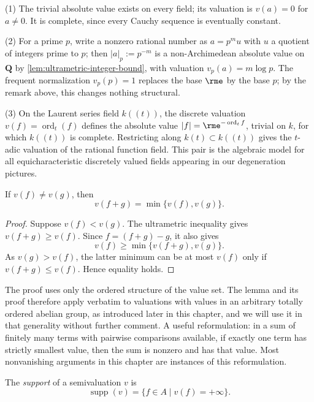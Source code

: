\begin{example}\label{ex:basic-absolute-values}
(1) The trivial absolute value exists on every field; its valuation is
$v(a)=0$ for $a\ne0$. It is complete, since every Cauchy sequence is
eventually constant.

(2) For a prime $p$, write a nonzero rational number as
$a=p^{m}u$ with $u$ a quotient of integers prime to $p$; then
$|a|_p:=p^{-m}$ is a non-Archimedean absolute value on $\mathbf Q$ by
\cref{lem:ultrametric-integer-bound}, with valuation
$v_p(a)=m\log p$. The frequent normalization $v_p(p)=1$ replaces the base
$\rme$ by the base $p$; by the remark above, this changes nothing
structural.

(3) On the Laurent series field $k((t))$, the discrete valuation
$v(f)=\operatorname{ord}_t(f)$ defines the absolute value
$|f|=\rme^{-\operatorname{ord}_t f}$, trivial on $k$, for which
$k((t))$ is complete. Restricting
along $k(t)\subset k((t))$ gives the $t$-adic valuation of the rational
function field. This pair is the algebraic model for all
equicharacteristic discretely valued fields appearing in our
degeneration pictures.
\end{example}

\begin{lemma}\label{lem:strong-triangle-equality}
If $v(f)\ne v(g)$, then
\[
                           v(f+g)=\min\{v(f),v(g)\}.
\]
\end{lemma}
\begin{proof}
Suppose $v(f)<v(g)$. The ultrametric inequality gives
$v(f+g)\geq v(f)$. Since $f=(f+g)-g$, it also gives
\[
 v(f)\geq\min\{v(f+g),v(g)\}.
\]
As $v(g)>v(f)$, the latter minimum can be at most $v(f)$ only if
$v(f+g)\leq v(f)$. Hence equality holds.
\end{proof}

The proof uses only the ordered structure of the value set. The lemma and
its proof therefore apply verbatim to valuations with values in an
arbitrary totally ordered abelian group, as introduced later in this
chapter, and we will use it in that generality without further comment. A
useful reformulation: in a sum of finitely many terms with pairwise
comparisons available, if exactly one term has strictly smallest value,
then the sum is nonzero and has that value. Most nonvanishing arguments in
this chapter are instances of this reformulation.

\begin{definition}\label{def:semivaluation-support}
The \emph{support} of a semivaluation $v$ is
\[
                         \operatorname{supp}(v)
          =\{f\in A\mid v(f)=+\infty\}.
\]
\end{definition}

